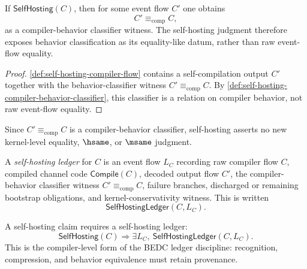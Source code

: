\begin{proposition}
\label{prop:self-hosting-compiler-not-raw-equality}
If $\mathsf{SelfHosting}(C)$, then for some event flow $C'$ one obtains
$$
  C'\equiv_{\mathrm{comp}}C,
$$
as a compiler-behavior classifier witness. The self-hosting judgment therefore exposes behavior classification as its equality-like datum, rather than raw event-flow equality.
\end{proposition}

\begin{proof}
\autoref{def:self-hosting-compiler-flow} contains a self-compilation output $C'$ together with the behavior-classifier witness $C'\equiv_{\mathrm{comp}}C$. By \autoref{def:self-hosting-compiler-behavior-classifier}, this classifier is a relation on compiler behavior, not raw event-flow equality.
\end{proof}

\begin{corollary}
\label{cor:self-hosting-compiler-not-kernel-equality}
Since $C'\equiv_{\mathrm{comp}}C$ is a compiler-behavior classifier, self-hosting asserts no new kernel-level equality, $\hsame$, or $\msame$ judgment.
\end{corollary}

\begin{definition}
\label{def:self-hosting-compiler-ledger}
A \emph{self-hosting ledger} for $C$ is an event flow $L_C$ recording raw compiler flow $C$, compiled channel code $\mathsf{Compile}(C)$, decoded output flow $C'$, the compiler-behavior classifier witness $C'\equiv_{\mathrm{comp}}C$, failure branches, discharged or remaining bootstrap obligations, and kernel-conservativity witness. This is written
$$
  \mathsf{SelfHostingLedger}(C,L_C).
$$
\end{definition}

\begin{principle}
\label{prin:self-hosting-compiler-no-self-hosting-without-ledger}
A self-hosting claim requires a self-hosting ledger:
$$
  \mathsf{SelfHosting}(C)
  \Longrightarrow
  \exists L_C,\ \mathsf{SelfHostingLedger}(C,L_C).
$$
This is the compiler-level form of the BEDC ledger discipline: recognition, compression, and behavior equivalence must retain provenance.
\end{principle}

